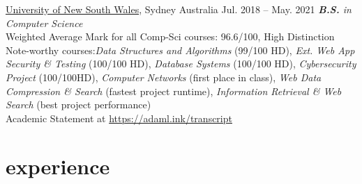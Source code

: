 \documentclass[hidelinks__VERSION__]{adamyi-cv}
\begin{document}
\begin{entrylist}


\entry
{\href{https://unsw.edu.au}{University of New South Wales}, Sydney Australia}
{Jul. 2018 -- May. 2021}
{\emph{\textbf{B.S.} in Computer Science}\\
Weighted Average Mark for all Comp-Sci courses: 96.6/100, High Distinction\\
  Note-worthy courses:\emph{Data Structures and Algorithms} (99/100 HD), \emph{Ext. Web App Security \& Testing} (100/100 HD), \emph{Database Systems} (100/100 HD), \emph{Cybersecurity Project} (100/100HD), \emph{Computer Networks} (first place in class), \emph{Web Data Compression \& Search} (fastest project runtime), \emph{Information Retrieval \& Web Search} (best project performance)\\
Academic Statement at \href{https://adaml.ink/transcript}{https://adaml.ink/transcript}
}

\end{entrylist}


\section{experience}
\end{document}

